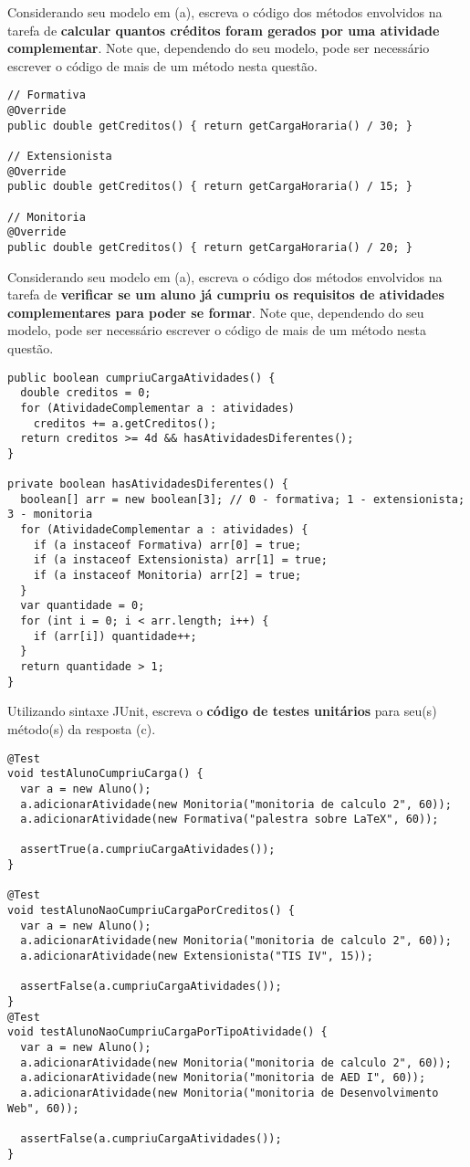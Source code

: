 \documentclass{lib/eng_softdoc}
\begin{document}
\subproblem Considerando seu modelo em (a), escreva o código dos métodos envolvidos na tarefa de \textbf{calcular quantos créditos foram gerados por uma atividade complementar}. Note que, dependendo do seu modelo, pode ser necessário escrever o código de mais de um método nesta questão.
\answer 
\begin{lstlisting}
// Formativa
@Override
public double getCreditos() { return getCargaHoraria() / 30; }

// Extensionista
@Override
public double getCreditos() { return getCargaHoraria() / 15; }

// Monitoria
@Override
public double getCreditos() { return getCargaHoraria() / 20; }

\end{lstlisting}

\subproblem Considerando seu modelo em (a), escreva o código dos métodos envolvidos na tarefa de \textbf{verificar se um aluno já cumpriu os requisitos de atividades complementares para poder se formar}. Note que, dependendo do seu modelo, pode ser necessário escrever o código de mais de um método nesta questão.

\answer 
\begin{lstlisting}
public boolean cumpriuCargaAtividades() {
  double creditos = 0;
  for (AtividadeComplementar a : atividades)
    creditos += a.getCreditos();
  return creditos >= 4d && hasAtividadesDiferentes();
}

private boolean hasAtividadesDiferentes() {
  boolean[] arr = new boolean[3]; // 0 - formativa; 1 - extensionista; 3 - monitoria
  for (AtividadeComplementar a : atividades) {
    if (a instaceof Formativa) arr[0] = true;
    if (a instaceof Extensionista) arr[1] = true;
    if (a instaceof Monitoria) arr[2] = true;
  }
  var quantidade = 0;
  for (int i = 0; i < arr.length; i++) {
    if (arr[i]) quantidade++;
  }
  return quantidade > 1;
}
\end{lstlisting}

\subproblem Utilizando sintaxe JUnit, escreva o \textbf{código de testes unitários} para seu(s) método(s) da resposta (c).

\answer 
\begin{lstlisting}
@Test
void testAlunoCumpriuCarga() {
  var a = new Aluno();
  a.adicionarAtividade(new Monitoria("monitoria de calculo 2", 60));
  a.adicionarAtividade(new Formativa("palestra sobre LaTeX", 60));

  assertTrue(a.cumpriuCargaAtividades());
}

@Test
void testAlunoNaoCumpriuCargaPorCreditos() {
  var a = new Aluno();
  a.adicionarAtividade(new Monitoria("monitoria de calculo 2", 60));
  a.adicionarAtividade(new Extensionista("TIS IV", 15));

  assertFalse(a.cumpriuCargaAtividades());
}
@Test
void testAlunoNaoCumpriuCargaPorTipoAtividade() {
  var a = new Aluno();
  a.adicionarAtividade(new Monitoria("monitoria de calculo 2", 60));
  a.adicionarAtividade(new Monitoria("monitoria de AED I", 60));
  a.adicionarAtividade(new Monitoria("monitoria de Desenvolvimento Web", 60));

  assertFalse(a.cumpriuCargaAtividades());
}

\end{lstlisting}
\end{document}
